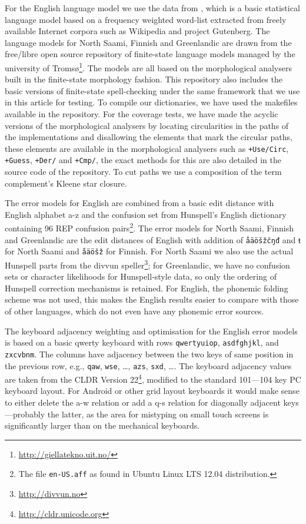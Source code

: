 \documentclass[a4paper,12pt]{article}
\begin{document}
For the English language model we use the data from
\cite{norvig/2010,pirinen2012effects}, which is a basic statistical language
model based on a frequency weighted word-list extracted from freely available
Internet corpora such as Wikipedia and project Gutenberg. The language models for
North Saami, Finnish and Greenlandic are drawn from the free/libre open source
repository of finite-state language models managed by the university of
Tromsø\footnote{\url{http://giellatekno.uit.no/}}. The models are all based on
the morphological analysers built in the finite-state morphology
\cite[]{beesley2003finite} fashion. This repository also includes the basic
versions of finite-state spell-checking under the same framework that we use in
this article for testing. To compile our dictionaries, we have used the
makefiles available in the repository. For the coverage tests, we have made
the acyclic versions of the morphological analysers by locating circularities
in the paths of the implementations and disallowing the elements that mark the
circular paths, these elements are available in the morphological analysers
such as \texttt{+Use/Circ}, \texttt{+Guess}, \texttt{+Der/} and \texttt{+Cmp/},
the exact methods for this are also detailed in the source code of the
repository. To cut paths we use a composition of the term complement's Kleene
star closure.

The error models for English are combined from a basic edit distance with
English alphabet a-z and the confusion set from Hunspell's English dictionary
containing 96 REP confusion pairs\footnote{The file \texttt{en-US.aff} as found
in Ubuntu Linux LTS 12.04 distribution.}. The error models for North Saami,
Finnish and Greenlandic are the edit distances of English with addition of
\texttt{åäöšžčŋđ} and { ŧ}
for North Saami and \texttt{åäöšž} for Finnish. For North
Saami we also use the actual Hunspell parts from the divvun
speller\footnote{\url{http://divvun.no}}; for Greenlandic, we have no confusion
sets or character likelihoods for Hunspell-style data, so only the ordering of
Hunspell correction mechanisms is retained.
 For English, the phonemic folding scheme was not used, this makes the
English results easier to compare with those of other languages, which do not
even have any phonemic error sources.

The keyboard adjacency weighting and optimisation for the English error models
is based on a basic qwerty keyboard with rows \texttt{qwertyuiop},
\texttt{asdfghjkl}, and \texttt{zxcvbnm}. The columns have adjacency between
the two keys of same position in the previous row, e.g., \texttt{qaw},
\texttt{wse}, \ldots, \texttt{azs}, \texttt{sxd}, \ldots. The keyboard
adjacency values are taken from the CLDR Version
22\footnote{\url{http://cldr.unicode.org}}, modified to the standard 101---104
key PC keyboard layout. For Android or other grid layout keyboards it would
make sense to either delete the a-w relation or add a q-s relation for
diagonally adjacent keys---probably the latter, as the area for mistyping on
small touch screens is significantly larger than on the mechanical keyboards.
\end{document}
